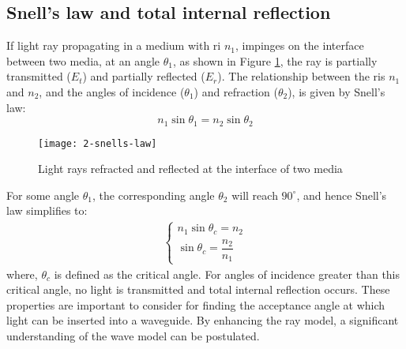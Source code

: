 \documentclass[../report.tex]{subfiles}
\begin{document}
		\subsection{Snell's law and total internal reflection}
If light ray propagating in a medium with \gls{ri} $n_1$, impinges on the interface between two media, at an angle $\theta_1$, as shown in Figure \ref{fig:2_snells_law}, the ray is partially transmitted ($E_t$) and partially reflected ($E_r$). The relationship between the \gls{ri}s $n_1$ and $n_2$, and the angles of incidence ($\theta_1$) and refraction ($\theta_2$), is given by Snell's law:
\begin{equation}\label{eq:snells_law}
n_1 \sin \theta_1 = n_2 \sin \theta_2
\end{equation}
\begin{figure}[H]
	\centering
	\texttt{[image: 2-snells-law]}
	\caption{Light rays refracted and reflected at the interface of two media}
	\label{fig:2_snells_law}
\end{figure}
For some angle $\theta_1$, the corresponding angle $\theta_2$ will reach $90^{\circ}$, and hence Snell’s law simplifies to:
\begin{equation}\label{eq:critical angle}
\begin{aligned}
\begin{cases}
n_1 \sin \theta_c = n_2\\
\sin \theta_c = \dfrac{n_2}{n_1}
\end{cases}
\end{aligned}
\end{equation}
where, $\theta_c$ is defined as the critical angle. For angles of incidence greater than this critical angle, no light is transmitted and total internal reflection occurs. These properties are important to consider for finding the acceptance angle at which light can be inserted into a waveguide. By enhancing the ray model, a significant understanding of the wave model can be postulated.
		
\end{document}
